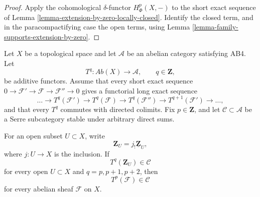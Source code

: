 \begin{proof}
Apply the cohomological $\delta$-functor $H^p_\Phi(X,-)$ to the short
exact sequence of Lemma
\ref{lemma-extension-by-zero-locally-closed}. Identify the closed term,
and in the paracompactifying case the open terms, using Lemma
\ref{lemma-family-supports-extension-by-zero}.
\end{proof}


\begin{lemma}
\label{lemma-cohomological-functor-local-generators}
\begin{reference}
\cite[Chapter III, \S 3.6, Proposition 3.6.1, pp. 167--169]{Tohoku}
\end{reference}
Let $X$ be a topological space and let $\mathcal{A}$ be an abelian
category satisfying AB4. Let
$$
T^q:\textit{Ab}(X)\longrightarrow\mathcal{A},
\qquad q\in\mathbf{Z},
$$
be additive functors. Assume that every short exact sequence
$0\to\mathcal{F}'\to\mathcal{F}\to\mathcal{F}''\to0$ gives a
functorial long exact sequence
$$
\ldots\to T^q(\mathcal{F}')\to T^q(\mathcal{F})\to
T^q(\mathcal{F}'')\to T^{q+1}(\mathcal{F}')\to\ldots,
$$
and that every $T^q$ commutes with directed colimits. Fix
$p\in\mathbf{Z}$, and let
$\mathcal{C}\subset\mathcal{A}$ be a Serre subcategory stable under
arbitrary direct sums.

For an open subset $U\subset X$, write
$$
\mathbf{Z}_U=j_!\underline{\mathbf{Z}}_U,
$$
where $j:U\to X$ is the inclusion. If
$$
T^q(\mathbf{Z}_U)\in\mathcal{C}
$$
for every open $U\subset X$ and $q=p,p+1,p+2$, then
$$
T^p(\mathcal{F})\in\mathcal{C}
$$
for every abelian sheaf $\mathcal{F}$ on $X$.
\end{lemma}

